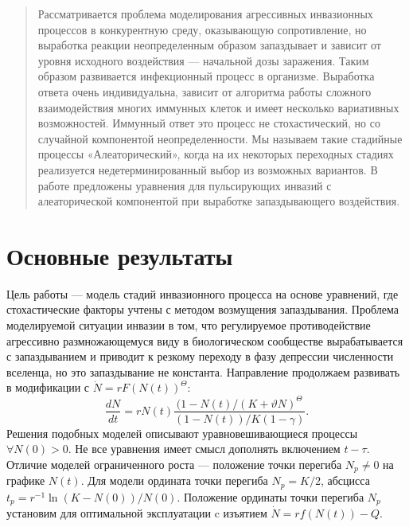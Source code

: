 \maketitle

\begin{abstract}
Рассматривается проблема моделирования агрессивных инвазионных процессов в конкурентную среду, оказывающую сопротивление, но выработка реакции неопределенным образом запаздывает и зависит от уровня исходного воздействия --- начальной дозы заражения. Таким образом развивается инфекционный процесс в организме. Выработка ответа очень индивидуальна, зависит от алгоритма работы сложного взаимодействия многих иммунных клеток и имеет несколько вариативных возможностей. Иммунный ответ это процесс не стохастический, но со случайной компонентой неопределенности. Мы называем такие стадийные процессы «Алеаторический», когда на их некоторых переходных стадиях реализуется недетерминированный выбор из возможных вариантов. В работе предложены уравнения для пульсирующих инвазий с алеаторической компонентой при выработке запаздывающего воздействия. 

\end{abstract}

\section{Основные результаты} %

Цель работы --- модель стадий инвазионного процесса на основе уравнений, где стохастические факторы учтены с методом возмущения запаздывания. Проблема моделируемой ситуации инвазии в том, что регулируемое противодействие агрессивно размножающемуся виду в биологическом сообществе вырабатывается с запаздыванием и приводит к резкому переходу в фазу депрессии численности вселенца, но это запаздывание не константа. 
Направление продолжаем развивать в модификации с $\dot N=rF(N(t))^\Theta$: 
$$
\frac{dN}{dt}=rN(t)\frac{(1- N(t)/(K+\vartheta N)^\Theta}{(1-N(t))/K(1-\gamma)}.
$$
Решения подобных моделей описывают уравновешивающиеся процессы $\forall N(0)>0$. Не все уравнения имеет смысл дополнять включением $t-\tau$. Отличие моделей ограниченного роста --- положение точки перегиба $N_p\neq0$ на графике $N(t)$. Для модели ордината точки перегиба $N_p=K/2$, абсцисса  $t_p=r^{-1}\ln(K-N(0))/N(0)$. Положение ординаты точки перегиба $N_p$ установим для оптимальной эксплуатации c изъятием $\dot N=rf(N(t))-Q$.


